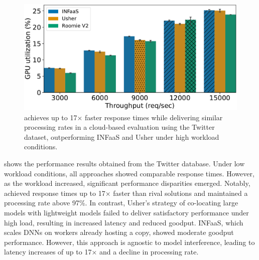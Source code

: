 \begin{figure}
\begin{minipage}[t]{.24\linewidth}
	\end{minipage}
	\hfill
	\begin{minipage}[t]{.24\linewidth}
		\centering
		\includegraphics[width=\linewidth]{chapters/roomie/images/NvidiaA100/twitter-all-models/gpu_utilization.pdf}
	\end{minipage}
	\caption{\roomie{} achieves up to 17$\times$ faster response times while delivering similar processing rates in a cloud-based evaluation using the Twitter dataset, outperforming INFaaS and Usher under high workload conditions.}
	\label{fig:NvidiaA100/twitter-all-models}
	\vspace{-3mm}
\end{figure}

 shows the performance results obtained from the Twitter database. Under low workload conditions, all approaches showed comparable response times. However, as the workload increased, significant performance disparities emerged. Notably,~\roomie{} achieved response times up to 17× faster than rival solutions and maintained a processing rate above 97\%. In contrast, Usher's strategy of co-locating large models with lightweight models failed to deliver satisfactory performance under high load, resulting in increased latency and reduced goodput. INFaaS, which scales DNNs on workers already hosting a copy, showed moderate goodput performance. However, this approach is agnostic to model interference, leading to latency increases of up to 17× and a decline in processing rate.

